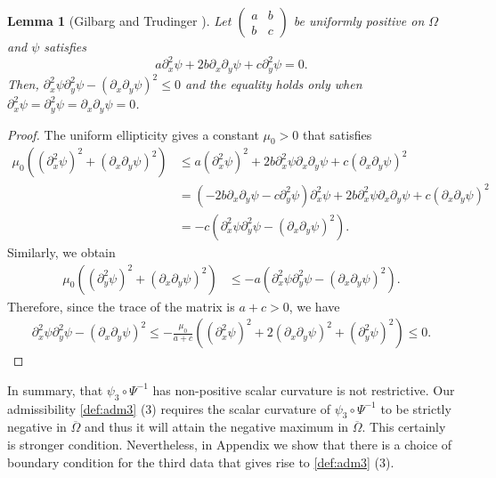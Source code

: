 \documentclass[11pt]{amsart}
\theoremstyle{plain}
\newtheorem{Lem}[Thm]{Lemma}
\theoremstyle{remark}
\numberwithin{equation}{section}
\numberwithin{Thm}{section}
\begin{document}
\begin{Lem}[Gilbarg and Trudinger {\cite[p. 256]{gilbarg_elliptic_2001}}] \label{lemma:scalarcurvature}
Let $\begin{pmatrix} a & b \\ b & c \end{pmatrix}$ be uniformly positive on $\Omega$ and $\psi$ satisfies
\begin{equation} \label{eq:phi2nd}
a\partial_x^2\psi + 2b\partial_x\partial_y\psi + c\partial_y^2\psi = 0.
\end{equation}
Then, $\partial_x^2\psi\partial_y^2\psi - (\partial_x\partial_y\psi)^2 \le 0$ and the equality holds only when $\partial_x^2\psi = \partial_y^2\psi = \partial_x\partial_y\psi = 0$.
\end{Lem}
\begin{proof}
The uniform ellipticity gives a constant $\mu_0>0$ that satisfies
  \begin{align*}
    \mu_0((\partial_x^2\psi)^2 + (\partial_x\partial_y\psi)^2) & \le a(\partial_x^2\psi)^2 + 2b\partial_x^2\psi\partial_x\partial_y\psi + c(\partial_x\partial_y\psi)^2 \\
    &= (-2b\partial_x\partial_y\psi-c\partial_y^2\psi)\partial_x^2\psi + 2b\partial_x^2\psi\partial_x\partial_y\psi + c(\partial_x\partial_y\psi)^2 \\
    &= -c(\partial_x^2\psi\partial_y^2\psi-(\partial_x\partial_y\psi)^2).
  \end{align*}
Similarly, we obtain
\begin{align*}
\mu_0((\partial_y^2\psi)^2 + (\partial_x\partial_y\psi)^2) & \le -a(\partial_x^2\psi\partial_y^2\psi-(\partial_x\partial_y\psi)^2).
\end{align*}
Therefore, since the trace of the matrix is $a+c>0$, we have
\begin{align*}
\partial_x^2\psi\partial_y^2\psi-(\partial_x\partial_y\psi)^2 \le -\frac{\mu_0}{a+c}((\partial_x^2\psi)^2 + 2(\partial_x\partial_y\psi)^2 + (\partial_y^2\psi)^2)\le0.
\end{align*}
\end{proof}

In summary, that $\psi_3\circ \Psi^{-1}$ has non-positive scalar curvature is not restrictive. Our admissibility \ref{def:adm3} (3) requires the scalar curvature of $\psi_3\circ \Psi^{-1}$ to be strictly negative in $\overline\Omega$ and thus it will attain the negative maximum in $\overline\Omega$. This certainly is stronger condition. Nevertheless, in Appendix we show that there is a choice of boundary condition for the third data that gives rise to   \ref{def:adm3} (3).
\end{document}
